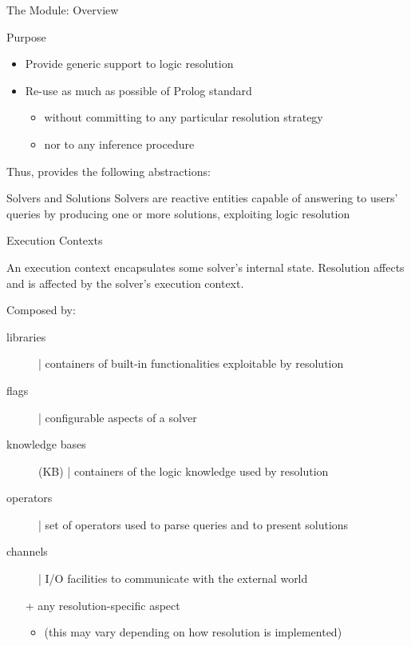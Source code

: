 \documentclass[handout]{beamer}
\begin{document}
\begin{frame}[allowframebreaks]{The  Module: Overview}

    \begin{block}{Purpose}
        \begin{itemize}
            \item Provide generic support to logic resolution
            \item Re-use as much as possible of Prolog standard
            \begin{itemize}
                \item without committing to any particular resolution strategy
                \item nor to any inference procedure
            \end{itemize}
        \end{itemize}
    \end{block}

    \framebreak

    Thus,  provides the following abstractions:

    \begin{block}{Solvers and Solutions}\centering
        Solvers are reactive entities capable of answering to users' queries by producing one or more solutions, exploiting logic resolution
    \end{block}

    \begin{block}{Execution Contexts}
        \begin{center}
            An execution context encapsulates some solver's internal state.
            Resolution affects and is affected by the solver's execution context.
        \end{center}

        \small
        Composed by:
        \begin{description}
            \item[libraries] | containers of built-in functionalities exploitable by resolution
            \item[flags] | configurable aspects of a solver
            \item[knowledge bases] (KB) | containers of the logic knowledge used by resolution
            \item[operators] | set of operators used to parse queries and to present solutions
            \item[channels] | I/O facilities to communicate with the external world
        \end{description}
        \begin{itemize}\small
            \item[+] any resolution-specific aspect
            \begin{itemize}\scriptsize
                \item (this may vary depending on how resolution is implemented)
            \end{itemize}
        \end{itemize}
    \end{block}


\end{frame}
\end{document}
